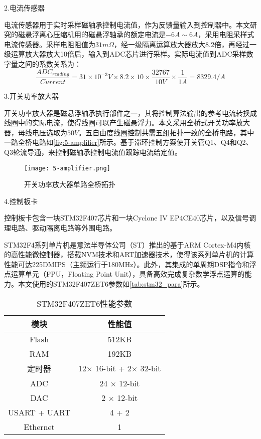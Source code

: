 \documentclass[
  lang=cn,
  degree=master,
  openany,oneside
]{nuaathesis}
\begin{document}
2.电流传感器

电流传感器用于实时采样磁轴承控制电流值，作为反馈量输入到控制器中。本文研究的磁悬浮离心压缩机用的磁悬浮轴承的额定电流是$-6A\sim 6A$，采用电阻采样式电流传感器。采样电阻阻值为$31m\Omega$，经一级隔离运算放大器放大8.2倍，再经过一级运算放大器放大10倍后，输入到ADC芯片进行采样。实际电流值到ADC采样数字量之间的系数关系为：
\begin{equation}
\frac{ADC_{reading}}{Current} = 31 \times 10^{-3}V \times 8.2 \times 10 \times \frac{32767}{10V} \times \frac{1}{1A} = 8329.4/A
\end{equation}

3.开关功率放大器

开关功率放大器是磁悬浮轴承执行部件之一，其将控制算法输出的参考电流转换成线圈中的实际电流，使得线圈可以产生磁悬浮力。本文采用全桥式开关功率放大器，母线电压选取为$50V$。五自由度线圈控制共需五组拓扑一致的全桥电路，其中一路全桥电路如\autoref{fig:5-amplifier}所示。基于滞环控制方案使开关管Q1、Q4和Q2、Q3轮流导通，来控制磁轴承控制电流值跟踪电流给定值。

\begin{figure}[h!]
	\texttt{[image: 5-amplifier.png]}
	\caption{开关功率放大器单路全桥拓扑}
	\label{fig:5-amplifier}
\end{figure}


4.控制板卡

控制板卡包含一块STM32F407芯片和一块Cyclone IV EP4CE40芯片，以及信号调理电路、驱动隔离电路等外围电路。

STM32F4系列单片机是意法半导体公司（ST）推出的基于ARM Cortex-M4内核的高性能微控制器，搭载NVM技术和ART加速器技术，使得该系列单片机的计算性能可达225DMIPS（主频运行于180MHz）。此外，其集成的单周期DSP指令和浮点运算单元（FPU，Floating Point Unit），具备高效完成复杂数学浮点运算的能力。本文使用的STM32F407ZET6参数如\autoref{tab:stm32_para}所示。

\begin{table}[h!]
  \caption[STM32F407ZET6性能参数]{STM32F407ZET6性能参数\label{tab:stm32_para}}
  \begin{tabular}{cc}
    \toprule
    模块 & 性能值 \\
    \midrule
    Flash & 512KB\\
    RAM & 192KB\\
    定时器 & 12$\times$ 16-bit + 2$\times$ 32-bit\\
    ADC & 24 $\times$ 12-bit\\
    DAC & 2 $\times$ 12-bit\\
    USART + UART & 4 + 2\\
    Ethernet & 1	\\
    \bottomrule
  \end{tabular}
\end{table}
\end{document}
